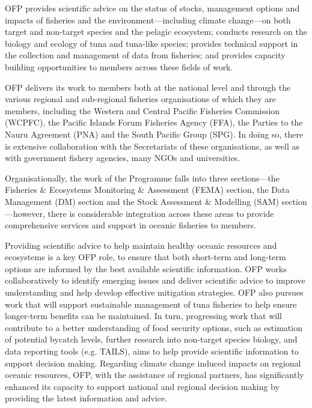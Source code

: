 \documentclass[11pt]{article}
\begin{document}
OFP provides scientific advice on the status of stocks, management options and impacts of fisheries and the environment---including climate change---on both target and non-target species and the pelagic ecosystem; conducts research on the biology and ecology of tuna and tuna-like species; provides technical support in the collection and management of data from fisheries; and provides capacity building opportunities to members across these fields of work.

OFP delivers its work to members both at the national level and through the various regional and sub-regional fisheries organisations of which they are members, including the Western and Central Pacific Fisheries Commission (WCPFC), the Pacific Islands Forum Fisheries Agency (FFA), the Parties to the Nauru Agreement (PNA) and the South Pacific Group (SPG). In doing so, there is extensive collaboration with the Secretariats of these organisations, as well as with government fishery agencies, many NGOs and universities.

Organisationally, the work of the Programme falls into three sections---the Fisheries \& Ecosystems Monitoring \& Assessment (FEMA) section, the Data Management (DM) section and the Stock Assessment \& Modelling (SAM) section---however, there is considerable integration across these areas to provide comprehensive services and support in oceanic fisheries to members.

Providing scientific advice to help maintain healthy oceanic resources and ecosystems is a key OFP role, to ensure that both short-term and long-term options are informed by the best available scientific information. OFP works collaboratively to identify emerging issues and deliver scientific advice to improve understanding and help develop effective mitigation strategies. OFP also pursues work that will support sustainable management of tuna fisheries to help ensure longer-term benefits can be maintained. In turn, progressing work that will contribute to a better understanding of food security options, such as estimation of potential bycatch levels, further research into non-target species biology, and data reporting tools (e.g. TAILS), aims to help provide scientific information to support decision making. Regarding climate change induced impacts on regional oceanic resources, OFP, with the assistance of regional partners, has significantly enhanced its capacity to support national and regional decision making by providing the latest information and advice. 
\end{document}
